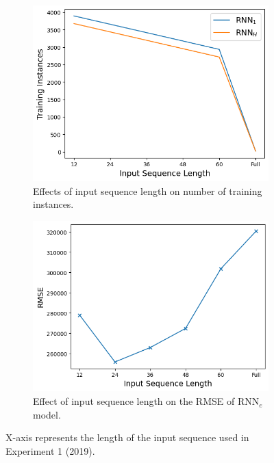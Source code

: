 \documentclass{article}
\begin{document}
\begin{figure}[htbp]
     \centering
     \begin{subfigure}[b]{.43\textwidth}
         \centering
         \includegraphics[width=\textwidth]{images/input length training instances.png}
         \caption{Effects of input sequence length on number of training instances.}
     \end{subfigure}
     \hfill
     \begin{subfigure}[b]{.45\textwidth}
         \centering
         \includegraphics[width=\textwidth]{images/input length.png}
         \caption{Effect of input sequence length on the RMSE of RNN$_e$ model.}
     \end{subfigure}
     \caption{X-axis represents the length of the input sequence used in Experiment 1 (2019).}
     \label{fig:inputlen}
\end{figure}
\end{document}
